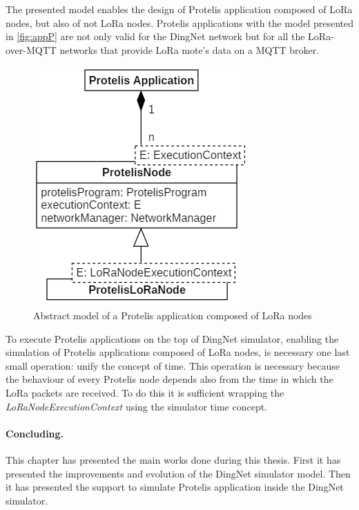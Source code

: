 % 
The presented model enables the design of Protelis application composed of LoRa nodes, but also of not LoRa nodes.
Protelis applications with the model presented in \autoref{fig:appP} are not only valid for the DingNet network but for all the LoRa-over-MQTT networks that provide LoRa mote's data on a MQTT broker.
% 
\begin{figure}[H]
    \centering
    \includegraphics{figures/app.png}
    \caption{Abstract model of a Protelis application composed of LoRa nodes}
    \label{fig:appP}
\end{figure}
% 
\noindent To execute Protelis applications on the top of DingNet simulator, enabling the simulation of Protelis applications composed of LoRa nodes, is necessary one last small operation: unify the concept of time. 
This operation is necessary because the behaviour of every Protelis node depends also from the time in which the LoRa packets are received.
To do this it is sufficient wrapping the \mbox{\textit{LoRaNodeExecutionContext}} using the simulator time concept.

\paragraph{Concluding.} This chapter has presented the main works done during this thesis. First it has presented the improvements and evolution of the DingNet simulator model. Then it has presented the support to simulate Protelis application inside the DingNet simulator. 